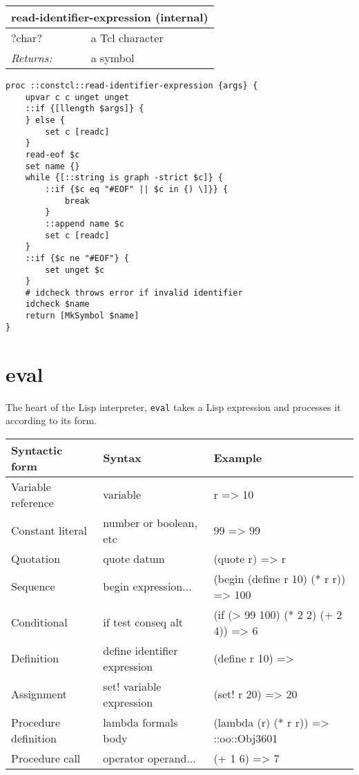 \documentclass{report}
\begin{document}
\begin{tabular}{ |l l| }
\hline
\multicolumn{2}{|l|}{read-identifier-expression (internal)} \\
\hline
?char? & a Tcl character \\
\textit{Returns:} & a symbol \\
\hline
\end{tabular}

\noindent\makebox[\linewidth]{\rule{\linewidth}{0.4pt}}
\begin{lstlisting}
proc ::constcl::read-identifier-expression {args} {
    upvar c c unget unget
    ::if {[llength $args]} {
    } else {
        set c [readc]
    }
    read-eof $c
    set name {}
    while {[::string is graph -strict $c]} {
        ::if {$c eq "#EOF" || $c in {) \]}} {
            break
        }
        ::append name $c
        set c [readc]
    }
    ::if {$c ne "#EOF"} {
        set unget $c
    }
    # idcheck throws error if invalid identifier
    idcheck $name
    return [MkSymbol $name]
}
\end{lstlisting}
\noindent\makebox[\linewidth]{\rule{\linewidth}{0.4pt}}
\section{eval}
\label{eval}

The heart of the Lisp interpreter, \texttt{eval} takes a Lisp expression and processes it according to its form.

\begin{tabular}{|l l l|}
\hline
Syntactic form & Syntax & Example \\
\hline
Variable reference & variable & r => 10 \\
Constant literal & number or boolean, etc & 99 => 99 \\
Quotation & quote datum & (quote r) => r \\
Sequence & begin expression... & (begin (define r 10) (* r r)) => 100 \\
Conditional & if test conseq alt & (if (> 99 100) (* 2 2) (+ 2 4)) => 6 \\
Definition & define identifier expression & (define r 10) => \\
Assignment & set! variable expression & (set! r 20) => 20 \\
Procedure definition & lambda formals body & (lambda (r) (* r r)) => ::oo::Obj3601 \\
Procedure call & operator operand... & (+ 1 6) => 7 \\
\hline
\end{tabular}
\end{document}
